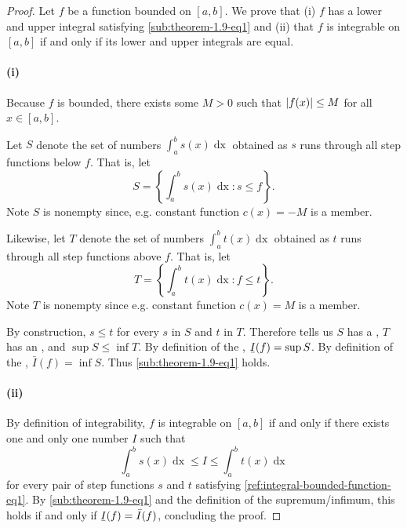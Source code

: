 \documentclass{report}
\begin{document}
  \begin{proof}

    Let $f$ be a function bounded on $[a, b]$.
    We prove that (i) $f$ has a lower and upper integral satisfying
      \eqref{sub:theorem-1.9-eq1} and (ii) that $f$ is integrable on $[a, b]$ if
      and only if its lower and upper integrals are equal.

    \paragraph{(i)}%

      Because $f$ is bounded, there exists some $M > 0$ such that
        $\left|f(x)\right| \leq M$ for all $x \in [a, b]$.

      Let $S$ denote the set of numbers $\int_a^b s(x) \mathop{dx}$ obtained as
        $s$ runs through all step functions below $f$.
      That is, let
        $$S = \left\{ \int_a^b s(x) \mathop{dx} : s \leq f \right\}.$$
      Note $S$ is nonempty since, e.g. constant function $c(x) = -M$ is a
        member.

      Likewise, let $T$ denote the set of numbers $\int_a^b t(x) \mathop{dx}$
        obtained as $t$ runs through all step functions above $f$.
      That is, let
        $$T = \left\{ \int_a^b t(x) \mathop{dx} : f \leq t \right\}.$$
      Note $T$ is nonempty since e.g. constant function $c(x) = M$ is a member.

      By construction, $s \leq t$ for every $s$ in $S$ and $t$ in $T$.
      Therefore  tells us $S$ has a
        , $T$ has an , and
        $\sup{S} \leq \inf{T}$.
      By definition of the ,
        $\ubar{I}(f) = \sup{S}$.
      By definition of the , $\bar{I}(f) = \inf{S}$.
      Thus \eqref{sub:theorem-1.9-eq1} holds.

    \paragraph{(ii)}%

      By definition of integrability, $f$ is integrable on $[a, b]$ if and only
        if there exists one and only one number $I$ such that
        $$\int_a^b s(x) \mathop{dx} \leq I \leq \int_a^b t(x) \mathop{dx}$$
        for every pair of step functions $s$ and $t$ satisfying
        \eqref{ref:integral-bounded-function-eq1}.
      By \eqref{sub:theorem-1.9-eq1} and the definition of the supremum/infimum,
        this holds if and only if $\ubar{I}(f) = \bar{I}(f)$, concluding the
        proof.

  \end{proof}
\end{document}
